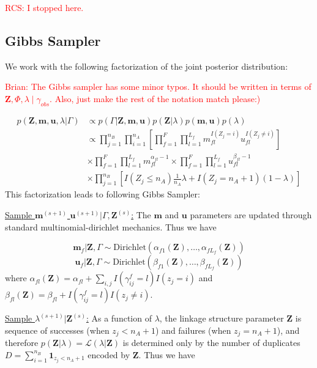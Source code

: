\documentclass[12pt,letterpaper]{article}
\newcommand{\1}[1]{\mathbb{I}\!\left[#1\right]} %
\begin{document}
\newpage
\textcolor{red}{RCS: I stopped here.}
\hypertarget{posterior-sampling}{%
	\subsection{Gibbs Sampler}
	\label{gibbs_sampling}}
We work with the following factorization of the joint posterior distribution:

\textcolor{red}{Brian: The Gibbs sampler has some minor typos. It should be written in terms of $\bm{Z}, \Phi, \lambda \mid \gamma_{obs}.$ Also, just make the rest of the notation match please:)}

\begin{align*}
p(\mathbf{Z}, \mathbf{m}, \mathbf{u}, \lambda|\Gamma) &\propto p(\Gamma|\mathbf{Z}, \mathbf{m}, \mathbf{u}) p(\mathbf{Z} | \lambda) p(\mathbf{m}, \mathbf{u}) p(\lambda) \\
&\propto \prod_{j=1}^{n_B}  \prod_{i=1}^{n_A}\left[ \prod_{f=1}^{F}\prod_{l=1}^{L_f} m_{fl}^{I(Z_j = i)}u_{fl}^{I(Z_j \neq i)}\right] \\
&\times  \prod_{f=1}^{F}\prod_{l=1}^{L_f} m_{fl}^{\alpha_{fl} - 1}  \times\prod_{f=1}^{F}\prod_{l=1}^{L_f} u_{fl}^{\beta_{fl} - 1} \\
&\times \prod_{j=1}^{n_B} \left[I(Z_j \leq n_A)\frac{1}{n_A}\lambda + I(Z_j = n_A + 1)(1 - \lambda)\right]
\end{align*}
This factorization leads to following Gibbs Sampler:

\underline{Sample $\mathbf{m}^{(s+1)}$ $\mathbf{u}^{(s+1)}|\Gamma, \mathbf{Z}^{(s)}$:}
The \(\mathbf{m}\) and \(\mathbf{u}\) parameters are updated through
standard multinomial-dirichlet mechanics. Thus we have

\[\mathbf{m}_f|\mathbf{Z}, \Gamma \sim \text{Dirichlet}(\alpha_{f1}(\mathbf{Z}), \ldots, \alpha_{fL_f}(\mathbf{Z}))\]
\[\mathbf{u}_f|\mathbf{Z}, \Gamma \sim \text{Dirichlet}(\beta_{f1}(\mathbf{Z}), \ldots, \beta_{fL_f}(\mathbf{Z}))\]
where
\(\alpha_{fl}(\mathbf{Z})= \alpha_{fl} + \sum_{i,j} I(\gamma_{ij}^f = l) I(z_j = i)\)
and
\(\beta_{fl}(\mathbf{Z})= \beta_{fl} + I(\gamma_{ij}^f = l) I(z_j \neq i)\).

\underline{Sample $\lambda^{(s+1)}|\mathbf{Z}^{(s)}$:} As a function of
\(\lambda\), the linkage structure parameter \(\mathbf{Z}\) is sequence
of successes (when \(z_j < n_A + 1\)) and failures (when
\(z_j = n_A + 1\)), and therefore
\(p(\mathbf{Z}|\lambda) = \mathcal{L}(\lambda|\mathbf{Z})\) is
determined only by the number of duplicates
\(D = \sum_{i=1}^{n_B}\mathbf{1}_{z_j < n_A + 1}\) encoded by
\(\mathbf{Z}\). Thus we have
\end{document}
